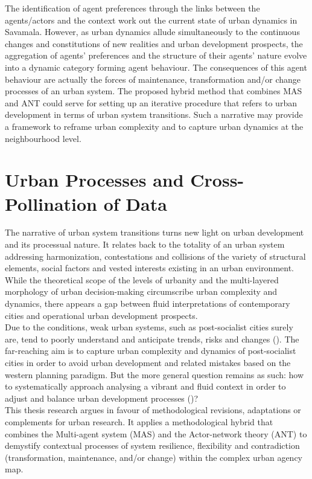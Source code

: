 \documentclass[11pt]{report}
\begin{document}
The identification of agent preferences through the links between the agents/actors and the context work out the current state of urban dynamics in Savamala. However,
as urban dynamics allude simultaneously to the continuous changes and constitutions of new realities and urban development prospects, the aggregation of agents’ preferences and the structure of their agents’ nature evolve into a dynamic category forming agent behaviour. The consequences of this agent behaviour are actually the forces of maintenance, transformation and/or change processes of an urban system. The proposed hybrid method that combines MAS and ANT could serve for setting up an iterative procedure that refers to urban development in terms of urban system transitions. Such a narrative may provide a framework to reframe urban complexity and to capture urban dynamics at the neighbourhood level.

\chapter{Urban Processes and Cross-Pollination of Data}

The narrative of urban system transitions turns new light on urban development and its processual nature. It relates back to the totality of an urban system addressing harmonization, contestations and collisions of the variety of structural elements, social factors and vested interests existing in an urban environment.
While the theoretical scope of the levels of urbanity and the multi-layered morphology of urban decision-making circumscribe urban complexity and dynamics, there appears a gap between fluid interpretations of contemporary cities and operational urban development prospects.
\\

Due to the conditions, weak urban systems, such as post-socialist cities surely are, tend to poorly understand and anticipate trends, risks and changes (\href{UN}{\cite{un_habitat_state_2012}}). 
The far-reaching aim is to capture urban complexity and dynamics of post-socialist cities in order to avoid urban development and related mistakes based on the western planning paradigm. 
But the more general question remains as such: how to systematically approach analysing a vibrant and fluid context in order to adjust and balance urban development processes (\href{Bolay}{\cite{bolay_technology_2011}})?
\\

This thesis research argues in favour of methodological revisions, adaptations or complements for urban research. It applies a methodological hybrid that combines the Multi-agent system (MAS) and the Actor-network theory (ANT) to demystify contextual processes of system resilience, flexibility and contradiction (transformation, maintenance, and/or change) within the complex urban agency map.
\\
\end{document}
